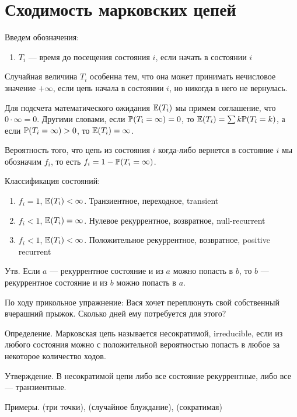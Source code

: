 \section{Сходимость марковских цепей}

Введем обозначения:

\begin{enumerate}
\item $T_i$ --- время до посещения состояния $i$, если начать в состоянии $i$
\end{enumerate}

Случайная величина $T_i$ особенна тем, что она может принимать нечисловое значение $+\infty$, если цепь начала в состоянии $i$, но никогда в него не вернулась. 

Для подсчета математического ожидания $\E(T_i)$ мы примем соглашение, что $0\cdot\infty=0$. Другими словами, если $\P(T_i=\infty)=0$, то $\E(T_i)=\sum k\P(T_i=k)$, а если $\P(T_i=\infty)>0$, то $\E(T_i)=\infty$.

Вероятность того, что цепь из состояния $i$ когда-либо вернется в состояние $i$ мы обозначим $f_i$, то есть $f_i=1-\P(T_i=\infty)$.

Классификация состояний:
\begin{enumerate}
\item $f_i=1$, $\E(T_i)<\infty$. Транзиентное, переходное, transient
\item $f_i<1$, $\E(T_i)=\infty$. Нулевое рекуррентное, возвратное, null-recurrent
\item $f_i<1$, $\E(T_i)<\infty$. Положительное рекуррентное, возвратное, positive recurrent
\end{enumerate}


Утв. Если $a$ --- рекуррентное состояние и из $a$ можно попасть в $b$, то $b$ --- рекуррентное состояние и из $b$ можно попасть в $a$.



По ходу прикольное упражнение: Вася хочет переплюнуть свой собственный вчерашний прыжок. Сколько дней ему потребуется для этого?

Определение. Марковская цепь называется несократимой, irreducible, если из любого состояния можно с положительной вероятностью попасть в любое за некоторое количество ходов.



Утверждение. В несократимой цепи либо все состояние рекуррентные, либо все --- транзиентные. 

Примеры. (три точки), (случайное блуждание), (сократимая)


